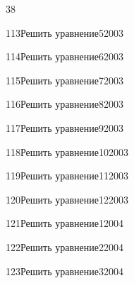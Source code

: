\begin{TrigSourcePage}{38}
\begin{TrigExercise}{113}{Решить уравнение}{5}{2003}
\end{TrigExercise}
\begin{TrigExercise}{114}{Решить уравнение}{6}{2003}
\end{TrigExercise}
\begin{TrigExercise}{115}{Решить уравнение}{7}{2003}
\end{TrigExercise}
\begin{TrigExercise}{116}{Решить уравнение}{8}{2003}
\end{TrigExercise}
\begin{TrigExercise}{117}{Решить уравнение}{9}{2003}
\end{TrigExercise}
\begin{TrigExercise}{118}{Решить уравнение}{10}{2003}
\end{TrigExercise}
\begin{TrigExercise}{119}{Решить уравнение}{11}{2003}
\end{TrigExercise}
\begin{TrigExercise}{120}{Решить уравнение}{12}{2003}
\end{TrigExercise}
\begin{TrigExercise}{121}{Решить уравнение}{1}{2004}
\end{TrigExercise}
\begin{TrigExercise}{122}{Решить уравнение}{2}{2004}
\end{TrigExercise}
\begin{TrigExercise}{123}{Решить уравнение}{3}{2004}
\end{TrigExercise}

\end{TrigSourcePage}
